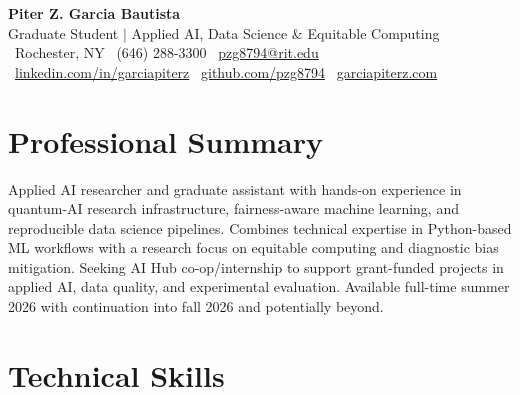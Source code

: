\documentclass[10pt]{article}
\begin{document}

\begin{center}
  {\Huge \textbf{Piter Z. Garcia Bautista}} \\
  \vspace{3pt}
  {\large Graduate Student $|$ Applied AI, Data Science \& Equitable Computing} \\
  \vspace{3pt}
  \faMapMarker* \, Rochester, NY \quad
  \faPhone \, (646) 288-3300 \quad
  \faEnvelope \, \href{mailto:pzg8794@rit.edu}{pzg8794@rit.edu} \\
  \vspace{2pt}
  \faLinkedin \, \href{https://linkedin.com/in/garciapiterz}{linkedin.com/in/garciapiterz} \quad
  \faGithub \, \href{https://github.com/pzg8794}{github.com/pzg8794} \quad
  \faGlobe \, \href{https://garciapiterz.com}{garciapiterz.com}
\end{center}


\section{Professional Summary}
Applied AI researcher and graduate assistant with hands-on experience in quantum-AI research infrastructure, fairness-aware machine learning, and reproducible data science pipelines. Combines technical expertise in Python-based ML workflows with a research focus on equitable computing and diagnostic bias mitigation. Seeking AI Hub co-op/internship to support grant-funded projects in applied AI, data quality, and experimental evaluation. Available full-time summer 2026 with continuation into fall 2026 and potentially beyond.


\section{Technical Skills}
\end{document}
